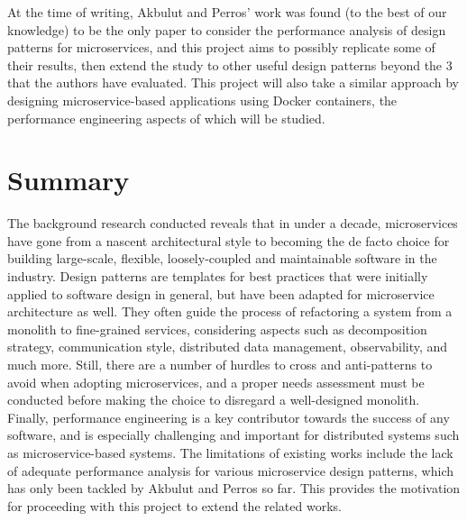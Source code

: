 At the time of writing, Akbulut and Perros' work was found (to the best of our knowledge) to be the only paper to consider the performance analysis of design patterns for microservices, and this project aims to possibly replicate some of their results, then extend the study to other useful design patterns beyond the 3 that the authors have evaluated. This project will also take a similar approach by designing microservice-based applications using Docker containers, the performance engineering aspects of which will be studied.

\section{Summary}

The background research conducted reveals that in under a decade, microservices have gone from a nascent architectural style to becoming the de facto choice for building large-scale, flexible, loosely-coupled and maintainable software in the industry. Design patterns are templates for best practices that were initially applied to software design in general, but have been adapted for microservice architecture as well. They often guide the process of refactoring a system from a monolith to fine-grained services, considering aspects such as decomposition strategy, communication style, distributed data management, observability, and much more. Still, there are a number of hurdles to cross and anti-patterns to avoid when adopting microservices, and a proper needs assessment must be conducted before making the choice to disregard a well-designed monolith. Finally, performance engineering is a key contributor towards the success of any software, and is especially challenging and important for distributed systems such as microservice-based systems. The limitations of existing works include the lack of adequate performance analysis for various microservice design patterns, which has only been tackled by Akbulut and Perros \cite{akbulut19} so far. This provides the motivation for proceeding with this project to extend the related works.
